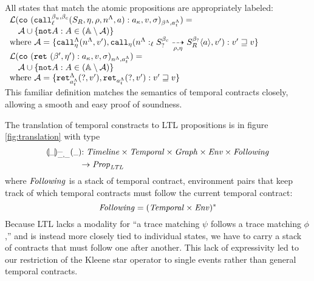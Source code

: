 \documentclass[preprint,onecolumn,9pt]{sigplanconf} %
\begin{document}
All states that match the atomic propositions are appropriately labeled: \\
$
\begin{array}{l}
 \labelof(\co{\spush{\kmcall{\mmlab_u}{\mmlab_c}{\mlab}{\mscon_R, \mtimeline, \menv, \mtoplevelname, \maddr}}{\mkaddr}, \mval, \msto}{\msmlab}{\mstimeline})
  =\\
 \quad \mtconNoB \cup \setbuild{\apneg{\mevent}}{\mevent \in (\ltlactions \setminus \mtconNoB)}
 \\ \text{where } \mtconNoB = \setbuild{\aptopcall{\mtoplevelname}{\mval'}{\mtimeline},
                                     \apvcall{\blclos{\mtoplevelname}{\mmlab_?}{\mmlab_c}{\mlab}{\mscon_?}{\mscon_R}{\menv}{\mtimeline}{\maddr}}{\mval'}{\mtimeline}}
                                       {\mval' \sqsupseteq \mval}
\\
 \labelof(\co{\spush{\krt{\mmlab',\mtimeline'}}{\mkaddr}, \mval, \msto}{\mtoplevelname}{\mstimeline}) =\\
 \quad \mtconNoB \cup \setbuild{\apneg{\mevent}}{\mevent \in (\ltlactions \setminus \mtconNoB)}
 \\ \text{where } \mtconNoB = \setbuild{\aptopret{?}{\mval'}{\mstimeline},
                                        \apvret{?}{\mval'}{\mstimeline}}
                                       {\mval' \sqsupseteq \mval}
\end{array}$
\\
This familiar definition matches the semantics of temporal contracts closely, allowing a smooth and easy proof of soundness.

The translation of temporal constracts to LTL propositions is in figure \autoref{fig:translation} with type
\begin{align*}
{\scriptsize \toltl{\_}{\_}{\_}{\_}{\_}} &{\scriptsize : \Timeline \times \TContract \times \Graph \times \Env \times \TConEnvStack}\\ & {\scriptsize \to \LTLProp}
\end{align*}
%
where $\TConEnvStack$ is a stack of temporal contract, environment pairs that keep track of which temporal contracts must follow the current temporal contract:
%
\begin{equation*}
  \TConEnvStack = (\TContract \times \Env)^*
\end{equation*}
%
Because LTL lacks a modality for ``a trace matching $\psi$ follows a trace matching $\phi$,'' and is instead more closely tied to individual states, we have to carry a stack of contracts that must follow one after another.
%
This lack of expressivity led to our restriction of the Kleene star operator to single events rather than general temporal contracts.
\end{document}
